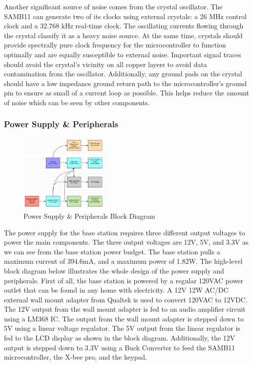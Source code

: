 \documentclass[journal,compsoc]{IEEEtran}
\begin{document}
Another significant source of noise comes from the crystal oscillator.  The SAMB11 can generate two of its clocks using external crystals: a 26 MHz control clock and a 32.768 kHz real-time clock.  The oscillating currents flowing through the crystal classify it as a heavy noise source.  At the same time, crystals should provide spectrally pure clock frequency for the microcontroller to function optimally and are equally susceptible to external noise.  Important signal traces should avoid the crystal’s vicinity on all copper layers to avoid data contamination from the oscillator.  Additionally, any ground pads on the crystal should have a low impedance ground return path to the microcontroller’s ground pin to ensure as small of a current loop as possible.  This helps reduce the amount of noise which can be seen by other components.

\subsubsection {Power Supply \& Peripherals}

\begin{figure}[ht] 	%
\centering
\includegraphics[width=0.4\textwidth]{BlockDiagram.png}
\caption{ \space Power Supply \& Peripherals Block Diagram}
\label{Psupply}
\end{figure}

The power supply for the base station requires three different output voltages to power the main components. The three output voltages are 12V, 5V, and 3.3V as we can see from the base station power budget. The base station pulls a maximum current of 394.6mA, and a maximum power of 1.82W. The high-level block diagram below illustrates the whole design of the power supply and peripherals. First of all, the base station is powered by a regular 120VAC power outlet that can be found in any home with electricity. A 12V 12W AC/DC external wall mount adapter from Qualtek is used to convert 120VAC to 12VDC. The 12V output from the wall mount adapter is fed to an audio amplifier circuit using a LM368 IC. The output from the wall mount adapter is stepped down to 5V using a linear voltage regulator. The 5V output from the linear regulator is fed to the LCD display as shown in the block diagram. Additionally, the 12V output is stepped down to 3.3V using a Buck Converter to feed the SAMB11 microcontroller, the X-bee pro, and the keypad. 
\end{document}
